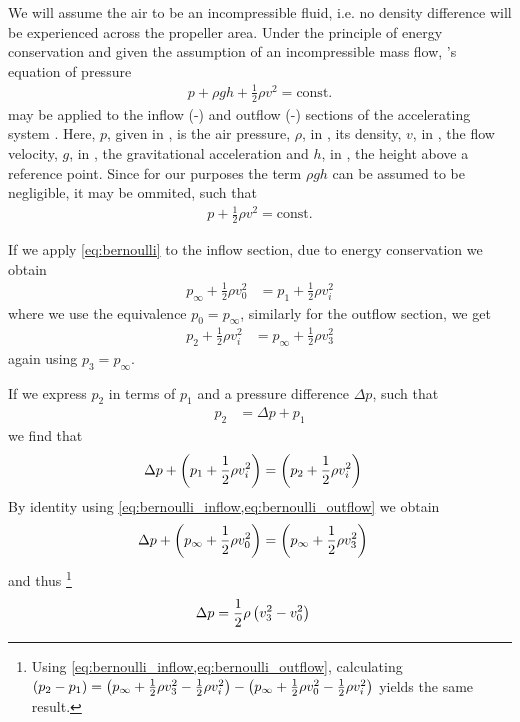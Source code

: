 We will assume the air to be an incompressible fluid, i.e. no density difference will be experienced across the propeller area. 
Under the principle of energy conservation and given the assumption of an incompressible mass flow, 's equation of pressure
%
\begin{align}
p + \rho g h + \frac{1}{2}\rho v^2 = \text{const.}
\end{align}
%
may be applied to the inflow (-) and outflow (-) sections of the accelerating system \cite{seddon2002}.
Here, $p$, given in \withunit{\newton\per\square\metre}, is the air pressure, 
$\rho$, in \withunit{\kilo\gram\per\cubic\metre}, its density,
$v$, in \withunit{\metre\per\second}, the flow velocity,
$g$, in , the gravitational acceleration and
$h$, in \withunit{\metre}, the height above a reference point.
%
%
Since for our purposes the term $\rho g h$ can be assumed to be negligible, it may be ommited, such that
%
\begin{align}
p + \frac{1}{2} \rho v^2 = \text{const.} \label{eq:bernoulli}
\end{align}

If we apply \cref{eq:bernoulli} to the inflow section, due to energy conservation we obtain
%
\begin{align}
p_\infty + \frac{1}{2} \rho v^2_0 &= p_1 + \frac{1}{2} \rho v^2_i \label{eq:bernoulli_inflow}
\end{align}
%
where we use the equivalence $p_0 = p_\infty$, similarly for the outflow section, we get
%
\begin{align}
p_2 + \frac{1}{2} \rho v^2_i &= p_\infty + \frac{1}{2} \rho v^2_3 \label{eq:bernoulli_outflow}
\end{align}
%
again using $p_3 = p_\infty$.

If we express $p_2$ in terms of $p_1$ and a pressure difference $\Delta p$, such that
\begin{align}
p_2 &= \Delta p + p_1
\end{align}
%
we find that
%
\begin{align}
\Delta p + \left( p_1 + \frac{1}{2} \rho v^2_i \right) &= \left(  p_2 + \frac{1}{2} \rho v^2_i \right)
\end{align}
%
By identity using \cref{eq:bernoulli_inflow,eq:bernoulli_outflow} we obtain
%
\begin{align}
\Delta p + \left( p_\infty + \frac{1}{2} \rho v^2_0 \right) &= \left( p_\infty + \frac{1}{2} \rho v^2_3 \right) \label{eq:bernoulli_induced_deltap}
\end{align}
%
and thus%
\footnote{Using \cref{eq:bernoulli_inflow,eq:bernoulli_outflow}, calculating
$\left( p_2 - p_1 \right) = \left(p_\infty + \frac{1}{2} \rho v^2_3 - \frac{1}{2} \rho v^2_i\right) - \left( p_\infty + \frac{1}{2} \rho v^2_0 - \frac{1}{2} \rho v^2_i\right)$ yields the same result.
}
%
\begin{align}
\Delta p &= \frac{1}{2} \rho \left( v^2_3 - v^2_0 \right)
\end{align}

